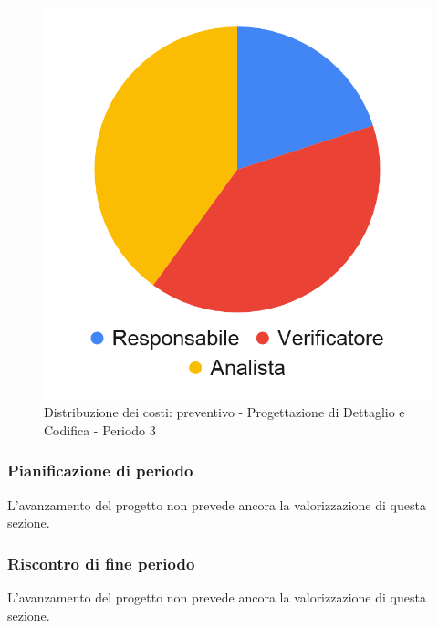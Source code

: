 \hspace{-1cm}
\begin{minipage}{.50\textwidth}
\smallPreventivoTable{
	
}
\end{minipage}
\hspace{1cm}
\begin{minipage}{.40\textwidth}
\begin{figure}[H]
	\includegraphics[scale=0.21]{res/images/charts/preventivo_priori/Grafico4-8.png}
	\caption{Distribuzione dei costi: preventivo - Progettazione di Dettaglio e Codifica - Periodo 3}
\end{figure}
\end{minipage} 



\subsubsection{Pianificazione di periodo}


L'avanzamento del progetto non prevede ancora la valorizzazione di questa sezione.



\subsubsection{Riscontro di fine periodo}


L'avanzamento del progetto non prevede ancora la valorizzazione di questa sezione.
